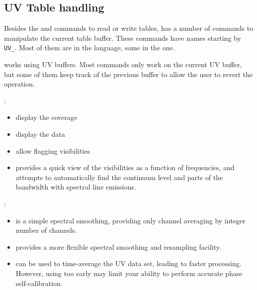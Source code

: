 \subsection{UV Table handling}

Besides the  and  commands to read
or write \uv{} tables, \imager{} has a number of commands to manipulate
the current \uv{} table buffer. These commands have names starting
by \texttt{UV\_}. Most of them are in the  language, some
in the  one. 

\imager{} works using UV buffers. Most commands only work on 
the current UV buffer, but some of them keep track of the previous
buffer to allow the user to revert the operation.

\begin{description}\itemsep 0pt

\item[Data inspection and editing]:
\begin{itemize}\itemsep 0pt
\item {} display the \uv{} coverage
\item {} display the \uv{} data
\item {} allow flagging visibilities
\item {} provides a quick view of the visibilities as a function
of frequencies, and attempts to automatically find the continuum level
and parts of the bandwidth with spectral line emissions.
\end{itemize}

\item[Data size reduction routines]:
\begin{itemize}\itemsep 0pt
\item {} is a simple spectral smoothing, providing only channel 
averaging by integer number of channels.
\item {} provides a more flexible spectral smoothing and resampling
facility. 
\item {}  can be used to time-average the UV data set, leading
to faster processing. However, using  too early may limit
your ability to perform accurate phase self-calibration.
\end{itemize}


\end{description}
